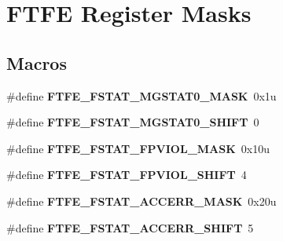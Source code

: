 \hypertarget{group___f_t_f_e___register___masks}{}\section{F\+T\+F\+E Register Masks}
\label{group___f_t_f_e___register___masks}
\subsection*{Macros}
\begin{DoxyCompactItemize}
\item 
\hypertarget{group___f_t_f_e___register___masks_ga8144f9200ceb6565f82fb1a1fa7cc81f}{}\#define {\bfseries F\+T\+F\+E\+\_\+\+F\+S\+T\+A\+T\+\_\+\+M\+G\+S\+T\+A\+T0\+\_\+\+M\+A\+S\+K}~0x1u\label{group___f_t_f_e___register___masks_ga8144f9200ceb6565f82fb1a1fa7cc81f}

\item 
\hypertarget{group___f_t_f_e___register___masks_ga0b957ce5ef0e701ed13ad42b933d07c3}{}\#define {\bfseries F\+T\+F\+E\+\_\+\+F\+S\+T\+A\+T\+\_\+\+M\+G\+S\+T\+A\+T0\+\_\+\+S\+H\+I\+F\+T}~0\label{group___f_t_f_e___register___masks_ga0b957ce5ef0e701ed13ad42b933d07c3}

\item 
\hypertarget{group___f_t_f_e___register___masks_ga5e42a62c072299c6b9e89000a88d14a6}{}\#define {\bfseries F\+T\+F\+E\+\_\+\+F\+S\+T\+A\+T\+\_\+\+F\+P\+V\+I\+O\+L\+\_\+\+M\+A\+S\+K}~0x10u\label{group___f_t_f_e___register___masks_ga5e42a62c072299c6b9e89000a88d14a6}

\item 
\hypertarget{group___f_t_f_e___register___masks_gad92dedd179d9ea0737c82d0e98e5d4ff}{}\#define {\bfseries F\+T\+F\+E\+\_\+\+F\+S\+T\+A\+T\+\_\+\+F\+P\+V\+I\+O\+L\+\_\+\+S\+H\+I\+F\+T}~4\label{group___f_t_f_e___register___masks_gad92dedd179d9ea0737c82d0e98e5d4ff}

\item 
\hypertarget{group___f_t_f_e___register___masks_gac4af2fee557a255ba6f2d9aa5d32aaaa}{}\#define {\bfseries F\+T\+F\+E\+\_\+\+F\+S\+T\+A\+T\+\_\+\+A\+C\+C\+E\+R\+R\+\_\+\+M\+A\+S\+K}~0x20u\label{group___f_t_f_e___register___masks_gac4af2fee557a255ba6f2d9aa5d32aaaa}

\item 
\hypertarget{group___f_t_f_e___register___masks_ga6bb97df7d14c6a986778b1d8acb765b8}{}\#define {\bfseries F\+T\+F\+E\+\_\+\+F\+S\+T\+A\+T\+\_\+\+A\+C\+C\+E\+R\+R\+\_\+\+S\+H\+I\+F\+T}~5\label{group___f_t_f_e___register___masks_ga6bb97df7d14c6a986778b1d8acb765b8}


\end{DoxyCompactItemize}
